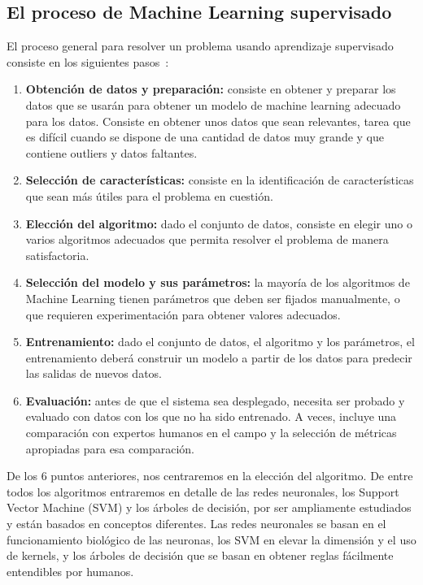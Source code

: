 \subsection{El proceso de Machine Learning supervisado}

El proceso general para resolver un problema usando aprendizaje supervisado consiste en los siguientes pasos~\cite{Marsland:2009:MLA:1571643}:

\begin{enumerate}
	\item \textbf{Obtención de datos y preparación:} consiste en obtener y preparar los datos que se usarán para obtener un modelo de machine learning adecuado para los datos. Consiste en obtener unos datos que sean relevantes, tarea que es difícil cuando se dispone de una cantidad de datos muy grande y que contiene outliers y datos faltantes.
	
	\item \textbf{Selección de características:} consiste en la identificación de características que sean más útiles para el problema en cuestión.
	
	\item \textbf{Elección del algoritmo:} dado el conjunto de datos, consiste en elegir uno o varios algoritmos adecuados que permita resolver el problema de manera satisfactoria.
	
	\item \textbf{Selección del modelo y sus parámetros:} la mayoría de los algoritmos de Machine Learning tienen parámetros que deben ser fijados manualmente, o que requieren experimentación para obtener valores adecuados.
	
	\item \textbf{Entrenamiento:} dado el conjunto de datos, el algoritmo y los parámetros, el entrenamiento deberá construir un modelo a partir de los datos para predecir las salidas de nuevos datos.
	
	\item \textbf{Evaluación:} antes de que el sistema sea desplegado, necesita ser probado y evaluado con datos con los que no ha sido entrenado. A veces, incluye una comparación con expertos humanos en el campo y la selección de métricas apropiadas para esa comparación.    
\end{enumerate}

De los 6 puntos anteriores, nos centraremos en la elección del algoritmo. De entre todos los algoritmos entraremos en detalle de las redes neuronales, los Support Vector Machine (SVM) y los árboles de decisión, por ser ampliamente estudiados y están basados en conceptos diferentes. Las redes neuronales se basan en el funcionamiento biológico de las neuronas, los SVM en elevar la dimensión y el uso de kernels, y los árboles de decisión que se basan en obtener reglas fácilmente entendibles por humanos.

